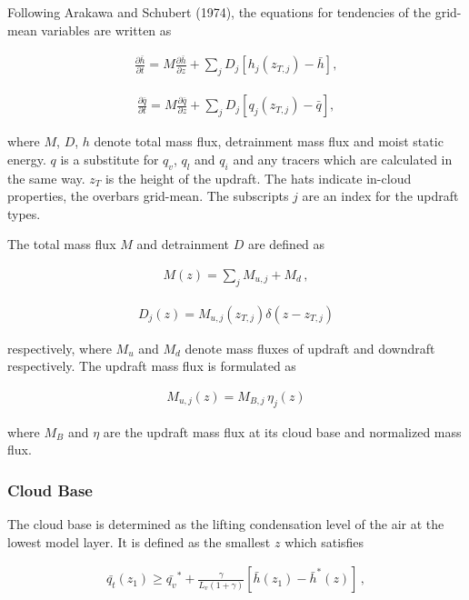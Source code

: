 Following Arakawa and Schubert (1974), the equations for tendencies of the grid-mean variables are written as

\begin{eqnarray}
 \frac{\partial \bar{h}}{\partial t} = M \frac{\partial \bar{h}}{\partial z} + \sum_j D_j \left[ h_j(z_{T,j}) - \bar{h} \right],
\end{eqnarray}

\begin{eqnarray}
 \frac{\partial \bar{q}}{\partial t} = M\frac{\partial \bar{q}}{\partial z} + \sum_j D_j \left[ q_j(z_{T,j}) - \bar{q} \right],
\end{eqnarray}

where \(M\), \(D\), \(h\) denote total mass flux, detrainment mass flux and moist static energy. \(q\) is a substitute for \(q_v\), \(q_l\) and \(q_i\) and any tracers which are calculated in the same
way. \(z_T\) is the height of the updraft. The hats indicate in-cloud properties, the overbars grid-mean. The subscripts \(j\) are an index for the updraft types.

The total mass flux \(M\) and detrainment \(D\) are defined as

\begin{eqnarray}
M(z) = \sum_j M_{u,j} + M_d \, ,
\end{eqnarray}

\begin{eqnarray}
 D_j(z) = M_{u,j}(z_{T,j}) \delta (z-z_{T,j})
\end{eqnarray}

respectively, where \(M_u\) and \(M_d\) denote mass fluxes of updraft and downdraft respectively. The updraft mass flux is formulated as

\begin{eqnarray}
 M_{u,j}(z) = M_{B,j} \, \eta_j(z)
\end{eqnarray}

where \(M_B\) and \(\eta\) are the updraft mass flux at its cloud base and normalized mass flux.

\hypertarget{cloud-base}{%
\subsubsection{Cloud Base}\label{cloud-base}}

The cloud base is determined as the lifting condensation level of the air at the lowest model layer. It is defined as the smallest \(z\) which satisfies

\begin{eqnarray}
  \bar{q_t}(z_1) \geq \bar{q_v}^* + \frac{\gamma}{L_v(1+\gamma)} \left[\bar{h}(z_1)-\bar{h}^*(z) \right]\,,
\end{eqnarray}


